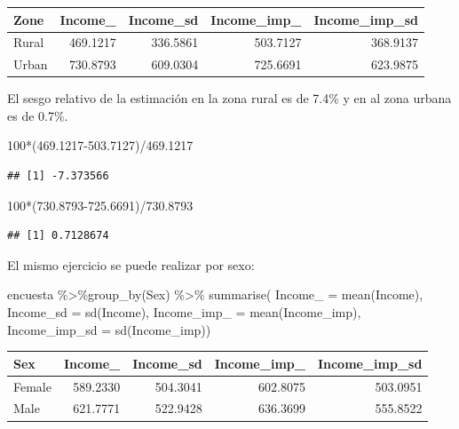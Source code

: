 \documentclass[
  12pt,
]{book}
\newenvironment{Shaded}{\begin{snugshade}}{\end{snugshade}}
\newcommand{\AttributeTok}[1]{\textcolor[rgb]{0.77,0.63,0.00}{#1}}
\newcommand{\DecValTok}[1]{\textcolor[rgb]{0.00,0.00,0.81}{#1}}
\newcommand{\FloatTok}[1]{\textcolor[rgb]{0.00,0.00,0.81}{#1}}
\newcommand{\FunctionTok}[1]{\textcolor[rgb]{0.00,0.00,0.00}{#1}}
\newcommand{\NormalTok}[1]{#1}
\newcommand{\SpecialCharTok}[1]{\textcolor[rgb]{0.00,0.00,0.00}{#1}}
\begin{document}
\begin{tabular}{l|r|r|r|r}
\hline
Zone & Income\_ & Income\_sd & Income\_imp\_ & Income\_imp\_sd\\
\hline
Rural & 469.1217 & 336.5861 & 503.7127 & 368.9137\\
\hline
Urban & 730.8793 & 609.0304 & 725.6691 & 623.9875\\
\hline
\end{tabular}

El sesgo relativo de la estimación en la zona rural es de 7.4\% y en al zona urbana es de 0.7\%.

\begin{Shaded}
\begin{Highlighting}[]
\DecValTok{100}\SpecialCharTok{*}\NormalTok{(}\FloatTok{469.1217{-}503.7127}\NormalTok{)}\SpecialCharTok{/}\FloatTok{469.1217}
\end{Highlighting}
\end{Shaded}

\begin{verbatim}
## [1] -7.373566
\end{verbatim}

\begin{Shaded}
\begin{Highlighting}[]
\DecValTok{100}\SpecialCharTok{*}\NormalTok{(}\FloatTok{730.8793{-}725.6691}\NormalTok{)}\SpecialCharTok{/}\FloatTok{730.8793}
\end{Highlighting}
\end{Shaded}

\begin{verbatim}
## [1] 0.7128674
\end{verbatim}

El mismo ejercicio se puede realizar por sexo:

\begin{Shaded}
\begin{Highlighting}[]
\NormalTok{encuesta }\SpecialCharTok{\%\textgreater{}\%}\FunctionTok{group\_by}\NormalTok{(Sex) }\SpecialCharTok{\%\textgreater{}\%}  \FunctionTok{summarise}\NormalTok{(}
  \AttributeTok{Income\_ =} \FunctionTok{mean}\NormalTok{(Income),}
  \AttributeTok{Income\_sd =} \FunctionTok{sd}\NormalTok{(Income),}
  \AttributeTok{Income\_imp\_ =} \FunctionTok{mean}\NormalTok{(Income\_imp),}
  \AttributeTok{Income\_imp\_sd =} \FunctionTok{sd}\NormalTok{(Income\_imp))}
\end{Highlighting}
\end{Shaded}

\begin{tabular}{l|r|r|r|r}
\hline
Sex & Income\_ & Income\_sd & Income\_imp\_ & Income\_imp\_sd\\
\hline
Female & 589.2330 & 504.3041 & 602.8075 & 503.0951\\
\hline
Male & 621.7771 & 522.9428 & 636.3699 & 555.8522\\
\hline
\end{tabular}
\end{document}
